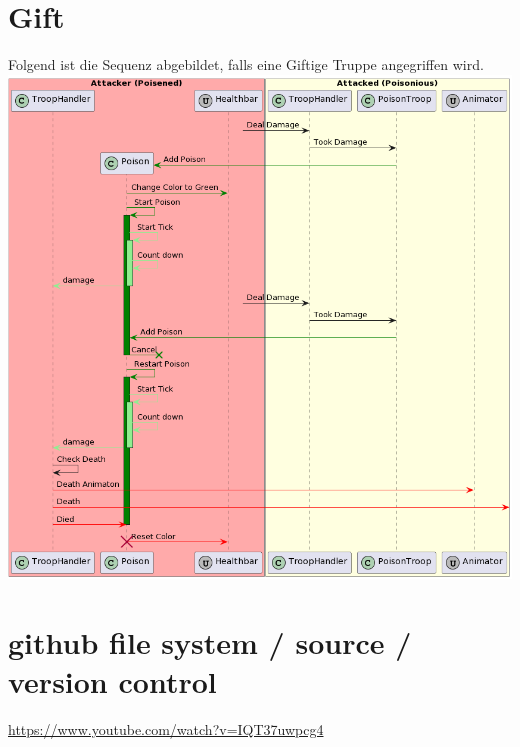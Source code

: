\section{Gift}
Folgend ist die Sequenz abgebildet, falls eine Giftige Truppe angegriffen wird. \\
\includegraphics[width=16cm]{resources/Poison.png} \\


\section*{github file system / source / version control}
\url{https://www.youtube.com/watch?v=IQT37uwpcg4}